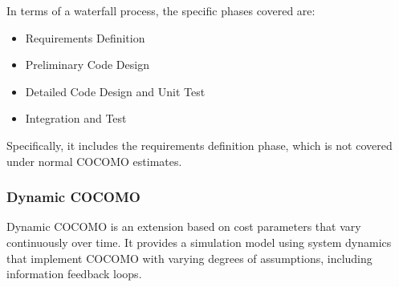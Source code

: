 In terms of a waterfall process, the specific phases covered are:
\begin{itemize}
  \item Requirements Definition
  \item Preliminary Code Design
  \item Detailed Code Design and Unit Test
  \item Integration and Test
\end{itemize}

Specifically, it includes the requirements definition phase, which
is not covered under normal COCOMO estimates.





\subsubsection{Dynamic COCOMO}

Dynamic COCOMO is an extension based on cost parameters that vary
continuously over time. It provides a simulation model using
system dynamics that implement COCOMO with varying degrees of
assumptions, including information feedback loops.